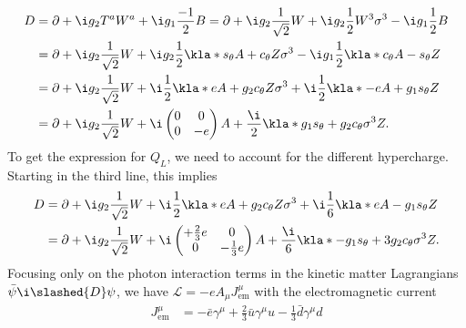 \documentclass[english, parskip=full]{scrbook}
\begin{document}
\begin{align}
D &= \partial + \i g_2 T^a W^a + \i g_1 \frac{-1}{2} B = \partial + \i g_2 \frac{1}{\sqrt{2}} W + \i g_2 \frac{1}{2} W^3 \sigma^3 - \i g_1 \frac{1}{2} B\\
&= \partial + \i g_2 \frac{1}{\sqrt{2}} W + \i g_2 \frac{1}{2} \kla*{s_\theta A + c_\theta Z} \sigma^3 - \i g_1 \frac{1}{2} \kla*{c_\theta A - s_\theta Z}\\
&= \partial + \i g_2 \frac{1}{\sqrt{2}} W + \i \frac{1}{2} \kla*{e A + g_2 c_\theta Z} \sigma^3 + \i \frac{1}{2} \kla*{-e A + g_1 s_\theta Z}\\
&= \partial + \i g_2 \frac{1}{\sqrt{2}} W + \i \begin{pmatrix}
0 & 0 \\ 0 & -e
\end{pmatrix} A + \frac{\i}{2} \kla*{g_1s_\theta + g_2c_\theta \sigma^3} Z.
\end{align}
To get the expression for $Q_L$, we need to account for the different hypercharge.
Starting in the third line, this implies
\begin{align}
D &= \partial + \i g_2 \frac{1}{\sqrt{2}} W + \i \frac{1}{2} \kla*{e A + g_2 c_\theta Z} \sigma^3 + \i \frac{1}{6} \kla*{e A - g_1 s_\theta Z}\\
&= \partial + \i g_2 \frac{1}{\sqrt{2}} W + \i \begin{pmatrix}
+\frac{2}{3}e & 0 \\ 0 & -\frac{1}{3}e
\end{pmatrix} A + \frac{\i}{6} \kla*{-g_1s_\theta + 3g_2c_\theta \sigma^3} Z.
\end{align}
Focusing only on the photon interaction terms in the kinetic matter Lagrangians $\bar{\psi}\i\slashed{D}\psi$, we have $\mathcal{L}=-eA_\mu J^\mu_\text{em}$ with the electromagnetic current
\begin{align}
J_\text{em}^\mu &= -\bar{e} \gamma^\mu + \frac{2}{3} \bar{u} \gamma^\mu u - \frac{1}{3} \bar{d} \gamma^\mu d
\end{align}
\end{document}
